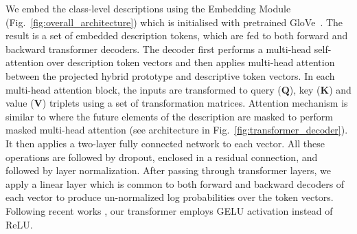 \documentclass{bmvc2k}
\begin{document}
We embed the class-level descriptions using the Embedding Module (Fig.~\ref{fig:overall_architecture}) which is initialised with pretrained GloVe~\cite{pennington2014glove}. The result is a set of embedded description tokens, which are fed to both forward and backward transformer decoders. The decoder first performs a multi-head self-attention over description token vectors and then applies multi-head attention between the projected hybrid prototype and descriptive token vectors. In each multi-head attention block, the inputs are transformed to query ($\textbf{Q}$), key ($\textbf{K}$) and value ($\textbf{V}$) triplets using a set of transformation matrices.  Attention mechanism is similar to \cite{transformer} where the future elements of the description are masked to perform masked multi-head attention (see architecture in Fig.~\ref{fig:transformer_decoder}). It then applies a two-layer fully connected network to each vector. All these operations are followed by dropout, enclosed in a residual connection, and followed by layer normalization. After passing through transformer layers, we apply a linear layer which is common to both forward and backward decoders of each vector to produce un-normalized log probabilities over the token vectors. Following recent works \cite{desai2020virtex}, our transformer employs GELU activation \cite{DBLP:journals/corr/HendrycksG16} instead of ReLU. 
\end{document}
